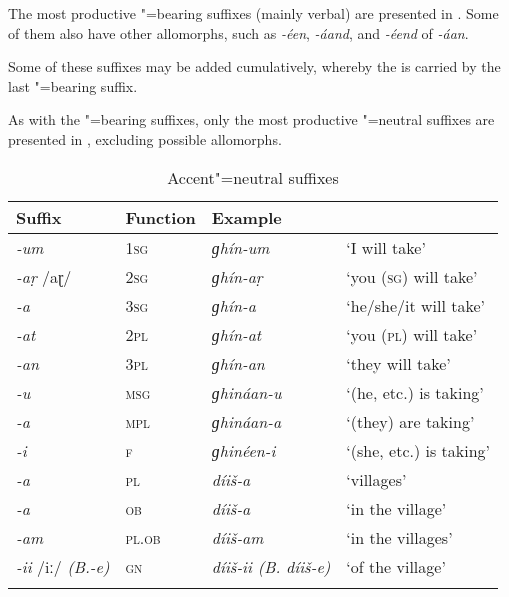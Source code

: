 The most productive "=bearing suffixes (mainly verbal) are presented in . Some of them also have other allomorphs, such as \textit{-éen}, \textit{-áand}, and \textit{-éend} of \textit{-áan}.


Some of these suffixes may be added cumulatively, whereby the  is carried by the last "=bearing suffix.


As with the "=bearing suffixes, only the most productive "=neutral suffixes are presented in , excluding possible allomorphs.



\begin{table}[ht]
\caption{Accent"=neutral suffixes}
\begin{tabularx}{\textwidth}{ l@{\hspace{20pt}} l@{\hspace{20pt}} l@{\hspace{20pt}} Q }
\lsptoprule
Suffix &
Function &
Example &
\\\hline
\textit{-um} &
\textsc{1sg} &
\textit{ɡhín-um} &
`I will take'\\
\textit{-aṛ} /aɽ/ &
\textsc{2sg} &
\textit{ɡhín-aṛ} &
`you (\textsc{sg}) will take'\\
\textit{-a} &
\textsc{3sg} &
\textit{ɡhín-a} &
`he/she/it will take'\\
\textit{-at} &
\textsc{2pl} &
\textit{ɡhín-at} &
`you (\textsc{pl}) will take'\\
\textit{-an} &
\textsc{3pl} &
\textit{ɡhín-an} &
`they will take'\\
\textit{-u} &
\textsc{msg} &
\textit{ɡhináan-u} &
`(he, etc.) is taking'\\
\textit{-a} &
\textsc{mpl} &
\textit{ɡhináan-a} &
`(they) are taking'\\
\textit{-i} &
\textsc{f} &
\textit{ɡhinéen-i} &
`(she, etc.) is taking'\\
\textit{-a} &
\textsc{pl} &
\textit{díiš-a} &
`villages'\\
\textit{-a} &
\textsc{ob} &
\textit{díiš-a} &
`in the village'\\
\textit{-am} &
\textsc{pl.ob} &
\textit{díiš-am} &
`in the villages'\\
\textit{-ii} /iː/ \textit{(B.-e)} &
\textsc{gn} &
\textit{díiš-ii (B. díiš-e)} &
`of the village'\\\lspbottomrule
\end{tabularx}
\label{tab:3-6}
\end{table}


